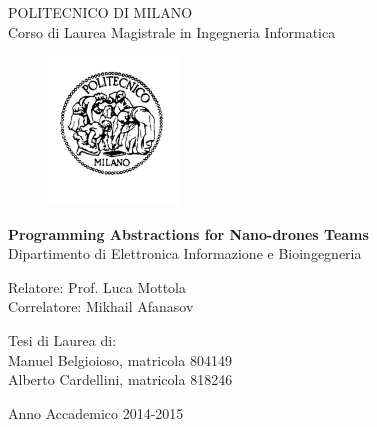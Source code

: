 \thispagestyle{empty}
\vspace*{-1.5cm} \bfseries{
\begin{center}
  \large
  POLITECNICO DI MILANO\\
  \normalsize
  Corso di Laurea Magistrale in Ingegneria Informatica\\
  
  \begin{figure}[htbp]
    \begin{center}
      \includegraphics[width=3.5cm]{./pictures/logopm}
    \end{center}
  \end{figure}
  \vspace*{0.3cm} \LARGE



  \textbf{Programming Abstractions for Nano-drones Teams}\\



  \vspace*{.75truecm} \large
  Dipartimento di Elettronica Informazione e Bioingegneria\\
\end{center}
\vspace*{3.0cm} \large
\begin{flushleft}


  Relatore: Prof. Luca Mottola \\
  Correlatore:  Mikhail Afanasov\\


\end{flushleft}
\vspace*{1.0cm}
\begin{flushright}


  Tesi di Laurea di:\\ Manuel Belgioioso, matricola 804149 \\ 
		       Alberto Cardellini, matricola 818246  \\


\end{flushright}
\vspace*{0.5cm}
\begin{center}



  Anno Accademico 2014-2015
\end{center} \clearpage
}